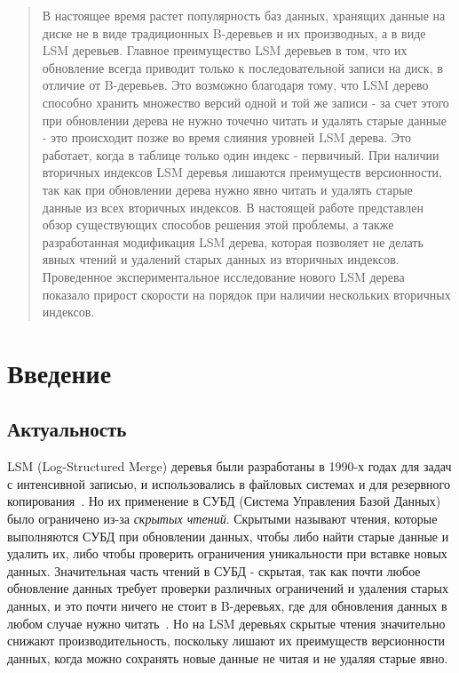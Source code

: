 \documentclass[a4paper,hidelinks,12pt]{article}
\begin{document}
\setcounter{page}{2}
\onehalfspacing

\begin{abstract}

В настоящее время растет популярность баз данных, хранящих данные на диске не в
виде традиционных B-деревьев и их производных, а в виде LSM деревьев. Главное
преимущество LSM деревьев в том, что их обновление всегда приводит только к
последовательной записи на диск, в отличие от B-деревьев. Это возможно благодаря
тому, что LSM дерево способно хранить множество версий одной и той же записи -
за счет этого при обновлении дерева не нужно точечно читать и удалять старые
данные - это происходит позже во время слияния уровней LSM дерева. Это работает,
когда в таблице только один индекс - первичный. При наличии вторичных индексов
LSM деревья лишаются преимуществ версионности, так как при обновлении дерева
нужно явно читать и удалять старые данные из всех вторичных индексов. В
настоящей работе представлен обзор существующих способов решения этой проблемы,
а также разработанная модификация LSM дерева, которая позволяет не делать явных
чтений и удалений старых данных из вторичных индексов. Проведенное
экспериментальное исследование нового LSM дерева показало прирост скорости на
порядок при наличии нескольких вторичных индексов.

\end{abstract}

\newpage
\tableofcontents

\newpage
\section{Введение}

\subsection{Актуальность}
LSM (Log-Structured Merge) деревья были разработаны в 1990-х годах для задач с
интенсивной записью, и использовались в файловых системах и для резервного
копирования~\cite{lsm-intro}. Но их применение в СУБД (Система Управления Базой
Данных) было ограничено из-за \textit {скрытых чтений}. Скрытыми называют
чтения, которые выполняются СУБД при обновлении данных, чтобы либо найти старые
данные и удалить их, либо чтобы проверить ограничения уникальности при вставке
новых данных. Значительная часть чтений в СУБД - скрытая, так как почти любое
обновление данных требует проверки различных ограничений и удаления старых
данных, и это почти ничего не стоит в B-деревьях, где для обновления данных в
любом случае нужно читать~\cite{btree-intro}. Но на LSM деревьях скрытые чтения
значительно снижают производительность, поскольку лишают их преимуществ
версионности данных, когда можно сохранять новые данные не читая и не удаляя
старые явно.
\end{document}
